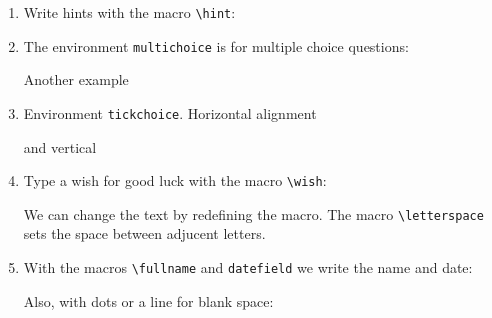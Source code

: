 \documentclass[12pt,a4page]{article}
\def\cellwidth{0.4\textwidth}
\newcommand{\miniexample}[3][t]{%
  \parbox[#1][#3][t]{\cellwidth}{#2}
}
\newcommand{\codeexample}[3][c]{%
  \colorbox[HTML]{b0c4be}{\miniexample[#1]{}{#3}}
}
\newcommand{\textexample}[3][c]{%
  {\footnotesize
    \colorbox[gray]{0.9}{\miniexample[#1]{}{#3}}%
  }
}
\newcommand{\examplerow}[3][10pt]{%
  \par\noindent\strut\hfill\codeexample{#2}{#3}\hspace{#1}\textexample{#2}{#3}\hfill\strut
}
\newlength{\exheight}
\begin{document}
\begin{enumerate}
  \setlength{\exheight}{54pt}
  \examplerow{exampleEnvirQuestion.tex}{\exheight}
\item Write hints with the macro \verb|\hint|:
  \setlength{\exheight}{173pt}
  \examplerow{exampleMacroHint.tex}{\exheight}
\item The environment \verb|multichoice| is for multiple choice questions:
  \setlength{\exheight}{53pt}
  \examplerow{exampleEnvirMultichoice01.tex}{\exheight}

  Another example
  \setlength{\exheight}{77pt}
  \examplerow{exampleEnvirMultichoice02.tex}{\exheight}
\item Environment \texttt{tickchoice}. Horizontal alignment
  \setlength{\exheight}{53pt}
  \examplerow{exampleEnvirTickchoice01.tex}{\exheight}

  and vertical

  \setlength{\exheight}{54pt}
  \examplerow{exampleEnvirTickchoice02.tex}{\exheight}
\item Type a wish for good luck with the macro \verb|\wish|:
  \setlength{\exheight}{30pt}
  \examplerow{exampleMacroWish01.tex}{\exheight}

  We can change the text by redefining the macro. The macro \verb/\letterspace/ sets the space between adjucent letters.
  \setlength{\exheight}{55pt}
  \examplerow{exampleMacroWish02.tex}{\exheight}

\item With the macros \verb|\fullname| and \verb|datefield| we write the name and date:
  \setlength{\exheight}{20pt}
  \examplerow{exampleMacroNameDate01.tex}{\exheight}

  Also, with dots or a line for blank space:
  \examplerow{exampleMacroNameDate02.tex}{\exheight}


\end{enumerate}
\end{document}
